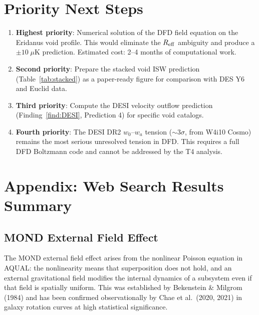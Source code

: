 \documentclass[11pt,a4paper]{article}
\begin{document}
\section{Priority Next Steps}
\label{sec:next-steps}

\begin{enumerate}
\item \textbf{Highest priority}: Numerical solution of the DFD field
  equation on the Eridanus void profile. This would eliminate the
  $R_{\rm eff}$ ambiguity and produce a $\pm 10\;\mu$K prediction.
  Estimated cost: 2--4 months of computational work.

\item \textbf{Second priority}: Prepare the stacked void ISW prediction
  (Table~\ref{tab:stacked}) as a paper-ready figure for comparison
  with DES Y6 and Euclid data.

\item \textbf{Third priority}: Compute the DESI velocity outflow
  prediction (Finding~\ref{find:DESI}, Prediction 4) for specific
  void catalogs.

\item \textbf{Fourth priority}: The DESI DR2 $w_0$--$w_a$ tension
  ($\sim 3\sigma$, from W4i10 Cosmo) remains the most serious
  unresolved tension in DFD. This requires a full DFD Boltzmann code
  and cannot be addressed by the T4 analysis.
\end{enumerate}


\section*{Appendix: Web Search Results Summary}

\subsection*{MOND External Field Effect}

The MOND external field effect arises from the nonlinear Poisson
equation in AQUAL: the nonlinearity means that superposition does
not hold, and an external gravitational field modifies the internal
dynamics of a subsystem even if that field is spatially uniform.
This was established by Bekenstein \& Milgrom (1984) and has been
confirmed observationally by Chae et al.\ (2020, 2021) in galaxy
rotation curves at high statistical significance.
\end{document}
